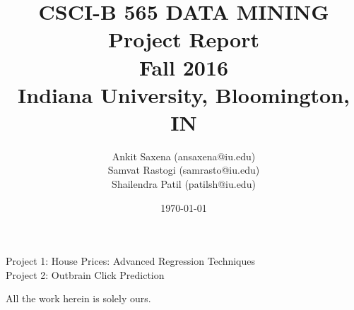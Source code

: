 \documentclass{article}
\begin{document}
\title{CSCI-B 565 DATA MINING \\
Project Report \\ Fall 2016\\ Indiana University, Bloomington, IN}
\author{Ankit Saxena (ansaxena@iu.edu) \\ Samvat Rastogi (samrasto@iu.edu) \\ Shailendra Patil (patilsh@iu.edu)}
\date{\today}
\maketitle

\begin{center}
Project 1: House Prices: Advanced Regression Techniques
\\ Project 2: Outbrain Click Prediction
\end{center}

\vspace{30mm}

\begin{center}All the work herein is solely ours.
\end{center}

\end{document}
